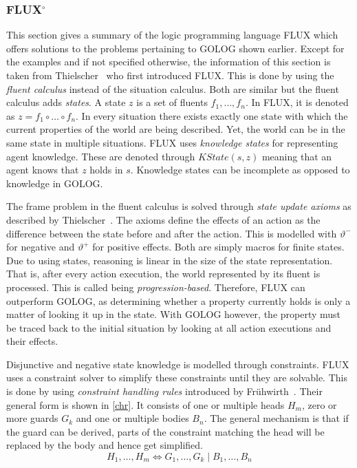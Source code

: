 \subsubsection[FLUX]{FLUX$^\circ$}\label{fun:apl_flux}
This section gives a summary of the logic programming language FLUX which offers solutions to the problems pertaining to GOLOG shown earlier.
Except for the examples and if not specified otherwise, the information of this section is taken from Thielscher~\cite{thielscher_flux:_2005} who first introduced FLUX.
This is done by using the \emph{fluent calculus} instead of the situation calculus.
Both are similar but the fluent calculus adds \emph{states}.
A state $z$ is a set of fluents $f_1,\dotsc,f_n$.
In FLUX, it is denoted as $z = f_1 \circ\dotsc\circ f_n$.
In every situation there exists exactly one state with which the current properties of the world are being described.
Yet, the world can be in the same state in multiple situations.
FLUX uses \emph{knowledge states} for representing agent knowledge.
These are denoted through $\textit{KState}(s,z)$ meaning that an agent knows that $z$ holds in $s$.
Knowledge states can be incomplete as opposed to knowledge in GOLOG.

The frame problem in the fluent calculus is solved through \emph{state update axioms} as described by Thielscher~\cite{thielscher_situation_1999}.
The axioms define the effects of an action as the difference between the state before and after the action.
This is modelled with $\vartheta^-$ for negative and $\vartheta^+$ for positive effects.
Both are simply macros for finite states.
Due to using states, reasoning is linear in the size of the state representation.
That is, after every action execution, the world represented by its fluent is processed.
This is called being \emph{progression-based}.
Therefore, FLUX can outperform GOLOG, as determining whether a property currently holds is only a matter of looking it up in the state.
With GOLOG however, the property must be traced back to the initial situation by looking at all action executions and their effects. %

Disjunctive and negative state knowledge is modelled through constraints.
FLUX uses a constraint solver to simplify these constraints until they are solvable.
This is done by using \emph{constraint handling rules} introduced by Frühwirth~\cite{fruhwirth_theory_1998}.
Their general form is shown in \autoref{chr}.
It consists of one or multiple heads $H_m$, zero or more guards $G_k$ and one or multiple bodies $B_n$.
The general mechanism is that if the guard can be derived, parts of the constraint matching the head will be replaced by the body and hence get simplified.
\begin{equation}\label{chr}
  H_1,\ldots,H_m\Leftrightarrow G_1,\ldots,G_k \mid B_1,\ldots,B_n
\end{equation}

